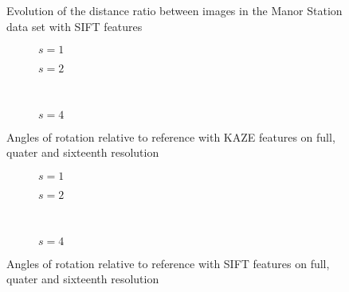 \begin{figure}
   {\centering      
      
      \caption{Evolution of the distance ratio between images in the Manor Station
      data set with SIFT features}
   \label{fig:manor_SIFT_dist_ratio}}
\end{figure}

\begin{figure}
   \begin{subfigure}{.5\linewidth}
      \centering      
      
      \label{fig:manor_KAZE_rotation_1}
      \caption{$s=1$}
   \end{subfigure}
   \quad
   \begin{subfigure}{.5\linewidth}
      \centering      
      
      \label{fig:manor_KAZE_rotation_2}
      \caption{$s=2$}
   \end{subfigure}\\[3ex]
   \begin{subfigure}{\linewidth}
      \centering      
      
      \label{fig:manor_KAZE_rotation_4}
      \caption{$s=4$}
   \end{subfigure}

   \caption{Angles of rotation relative to reference with
   KAZE features on full, quater and sixteenth resolution}
\end{figure}

\begin{figure}
   \begin{subfigure}{.5\linewidth}
      \centering      
      
      \label{fig:manor_SIFT_rotation_1}
      \caption{$s=1$}
   \end{subfigure}
   \quad
   \begin{subfigure}{.5\linewidth}
      \centering      
      
      \label{fig:manor_SIFT_rotation_2}
      \caption{$s=2$}
   \end{subfigure}\\[3ex]
   \begin{subfigure}{\linewidth}
      \centering      
      
      \label{fig:manor_SIFT_rotation_4}
      \caption{$s=4$}
   \end{subfigure}

   \caption{Angles of rotation relative to reference with
   SIFT features on full, quater and sixteenth resolution}
\end{figure}
